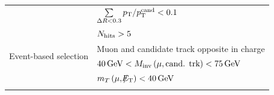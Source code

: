 \begin{table}[!h]
{\begin{tabular}{l|l }
                                                               &  $\sum \limits_{\Delta R < 0.3} p_{\text{T}}/p_{\text{T}}^{\text{cand}} < 0.1$\\  
                                                               &  $N_{\text{hits}}>5$             \\  
\midrule
\multirow{2}{*}{Event-based selection}                         &  Muon and candidate track opposite in charge                                     \\
                                                               &  $40\,\text{Ge}\kern-0.06667em\text{V}<M_{\text{inv}}\left( \mu, \text{cand. trk}  \right)<75\,\text{Ge}\kern-0.06667em\text{V}$        \\
                                                               & $m_T\left(\mu,\slash\mkern-12mu{E}_{\text{T}}\right)<40\,\text{Ge}\kern-0.06667em\text{V}$ \\

\bottomrule
\multicolumn{2}{c}{} \\
\end{tabular}}
\end{table}


